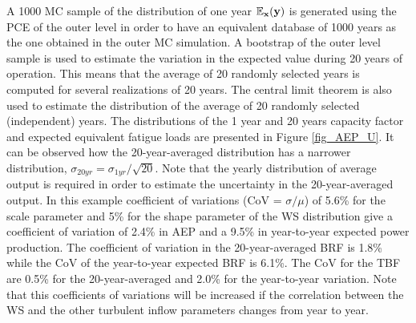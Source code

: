 \documentclass[preprint,12pt]{elsarticle}
\begin{document}
A 1000 MC sample of the distribution of one year $\mathbb{E}_{\mathbf{x}}(\mathbf{y})$ is generated using the PCE of the outer level in order to have an equivalent database of 1000 years as the one obtained in the outer MC simulation. A bootstrap of the outer level sample is used to estimate the variation in the expected value during 20 years of operation. This means that the average of 20 randomly selected years is computed for several realizations of 20 years. The central limit theorem is also used to estimate the distribution of the average of 20 randomly selected (independent) years. The distributions of the 1 year and 20 years capacity factor and expected equivalent fatigue loads are presented in Figure \ref{fig_AEP_U}. It can be observed how the 20-year-averaged distribution has a narrower distribution, $\sigma_{20yr} = \sigma_{1yr}/\sqrt{20}$. Note that the yearly distribution of average output is required in order to estimate the uncertainty in the 20-year-averaged output. In this example coefficient of variations (CoV = $\sigma/\mu$) of 5.6\% for the scale parameter and 5\% for the shape parameter of the WS distribution give a coefficient of variation of 2.4\% in AEP and a 9.5\% in year-to-year expected power production. The coefficient of variation in the 20-year-averaged BRF is 1.8\% while the CoV of the year-to-year expected BRF is 6.1\%. The CoV for the TBF are 0.5\% for the 20-year-averaged and 2.0\% for the year-to-year variation. Note that this coefficients of variations will be increased if the correlation between the WS and the other turbulent inflow parameters changes from year to year.
\end{document}
